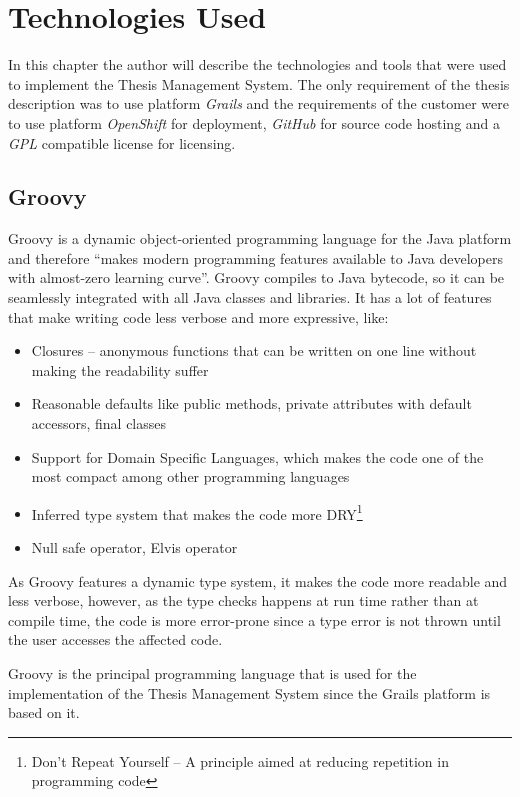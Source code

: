 \chapter{Technologies Used}

In this chapter the author will describe the technologies and tools that were used to implement the Thesis Management System. The only requirement of the thesis description was to use platform \emph{Grails} and the requirements of the customer were to use platform \emph{OpenShift} for deployment, \emph{GitHub} for source code hosting and a \emph{GPL} compatible license for licensing.

\section{Groovy}

Groovy is a dynamic object-oriented programming language for the Java platform and therefore ``makes modern programming features available to Java developers with almost-zero learning curve''\cite{groovy-homepage}. Groovy compiles to Java bytecode, so it can be seamlessly integrated with all Java classes and libraries\cite{groovy-homepage}. It has a lot of features that make writing code less verbose and more expressive, like:

\begin{itemize}
    \item Closures -- anonymous functions that can be written on one line without making the readability suffer
    \item Reasonable defaults like public methods, private attributes with default accessors, final classes
    \item Support for Domain Specific Languages, which makes the code one of the most compact among other programming languages
    \item Inferred type system that makes the code more DRY\footnote{Don't Repeat Yourself -- A principle aimed at reducing repetition in programming code}
    \item Null safe operator, Elvis operator
\end{itemize}

As Groovy features a dynamic type system, it makes the code more readable and less verbose, however, as the type checks happens at run time rather than at compile time, the code is more error-prone since a type error is not thrown until the user accesses the affected code.

Groovy is the principal programming language that is used for the implementation of the Thesis Management System since the Grails platform is based on it.

